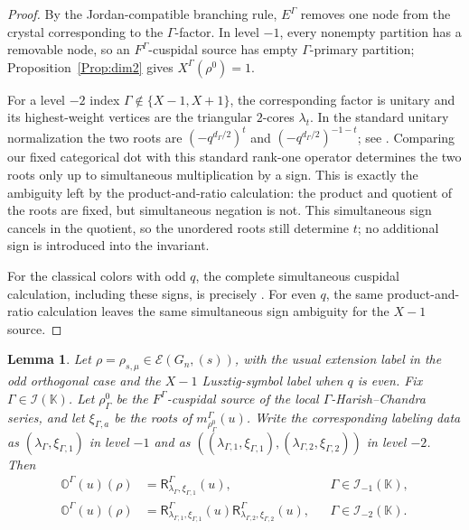 \documentclass[12pt]{amsart}
\numberwithin{itemcounter}{subsection}
\theoremstyle{plain}
\newtheorem{lemma}[theorem]{Lemma}
\theoremstyle{definition}
\theoremstyle{remark}
\numberwithin{equation}{section}
\def\bbK{\mathbb{K}}
\def\bbO{\mathbb{O}}
\def\calI{\mathcal{I}}
\begin{document}
\begin{proof}
By the Jordan-compatible branching rule, \(E^\Gamma\) removes one node from
the crystal corresponding to the \(\Gamma\)-factor.  In level \(-1\), every nonempty
partition has a removable node, so an \(F^\Gamma\)-cuspidal source has empty
\(\Gamma\)-primary partition; Proposition~\ref{Prop:dim2} gives
\(X^\Gamma(\rho^0)=1\).

For a level \(-2\) index \(\Gamma\notin\{X-1,X+1\}\), the corresponding factor is unitary and its
highest-weight vertices are the triangular \(2\)-cores \(\lambda_t\).  In
the standard unitary normalization the two roots are \((-q^{d_\Gamma/2})^t\) and
\((-q^{d_\Gamma/2})^{-1-t}\); see \cite[Theorem~4.12]{DVV19}.  Comparing our fixed
categorical dot with this standard rank-one operator determines the two roots only up to simultaneous multiplication by a sign.  This is exactly the ambiguity left by the product-and-ratio
calculation: the product and quotient of the roots are fixed, but simultaneous
negation is not.  This simultaneous sign cancels in the quotient, so the unordered roots still determine \(t\); no additional sign is introduced into the invariant.

For the classical colors with odd \(q\), the complete simultaneous cuspidal
calculation, including these signs, is precisely
\cite[Theorem~5.13 and Table~4]{LSZ25}.  For even \(q\), the same
product-and-ratio calculation leaves the same simultaneous sign ambiguity for the \(X-1\) source.
\end{proof}

\begin{lemma}\label{lem:jordan-bubble}
Let $\rho=\rho_{s,\mu}\in\mathcal E(G_n,(s))$, with the usual extension
label in the odd orthogonal case and the $X-1$ Lusztig-symbol label when $q$ is
even.  Fix $\Gamma\in\calI(\bbK)$.  Let $\rho^0_\Gamma$ be the
$F^\Gamma$-cuspidal source of the local $\Gamma$-Harish--Chandra series, and
let $\xi_{\Gamma,a}$ be the roots of $m_{\rho^0_\Gamma}^\Gamma(u)$.  Write the corresponding labeling data as
$(\lambda_\Gamma,\xi_{\Gamma,1})$ in level $-1$ and as
$((\lambda_{\Gamma,1},\xi_{\Gamma,1}),
  (\lambda_{\Gamma,2},\xi_{\Gamma,2}))$ in level $-2$.  Then
\begin{align}
\bbO^\Gamma(u)(\rho)
 &=\mathsf R^\Gamma_{\lambda_\Gamma,\xi_{\Gamma,1}}(u),
 &&\Gamma\in\calI_{-1}(\bbK),\label{eq:jordan-bubble-one}\\
\bbO^\Gamma(u)(\rho)
 &=\mathsf R^\Gamma_{\lambda_{\Gamma,1},\xi_{\Gamma,1}}(u)
   \mathsf R^\Gamma_{\lambda_{\Gamma,2},\xi_{\Gamma,2}}(u),
 &&\Gamma\in\calI_{-2}(\bbK).\label{eq:jordan-bubble-two}
\end{align}
\end{lemma}
\end{document}
